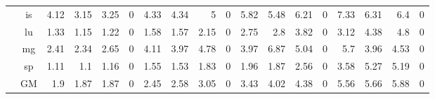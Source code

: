 \begin{table}[]
\begin{center}
\begin{tabular}{|c|c|rrrr|rrrr|rrrr|rrrr|}
 & is &          4.12 &          3.15 &         3.25 &             0 &        4.33 &          4.34 &            5 &             0 &         5.82 &           5.48 &          6.21 &              0  &          7.33 &           6.31 &           6.4 &              0 \\
 & lu &          1.33 &          1.15 &         1.22 &             0 &        1.58 &          1.57 &         2.15 &             0 &         2.75 &            2.8 &          3.82 &              0  &          3.12 &           4.38 &           4.8 &              0 \\
 & mg &          2.41 &          2.34 &         2.65 &             0 &        4.11 &          3.97 &         4.78 &             0 &         3.97 &           6.87 &          5.04 &              0  &           5.7 &           3.96 &          4.53 &              0 \\
 & sp &          1.11 &           1.1 &         1.16 &             0 &        1.55 &          1.53 &         1.83 &             0 &         1.96 &           1.87 &          2.56 &              0  &          3.58 &           5.27 &          5.19 &              0 \\ \cline{2-18}
 & GM &           1.9 &          1.87 &         1.87 &             0 &        2.45 &          2.58 &         3.05 &             0 &         3.43 &           4.02 &          4.38 &              0  &          5.56 &           5.66 &          5.88 &              0 \\ \hline
\end{tabular}
\end{center}
\end{table}


